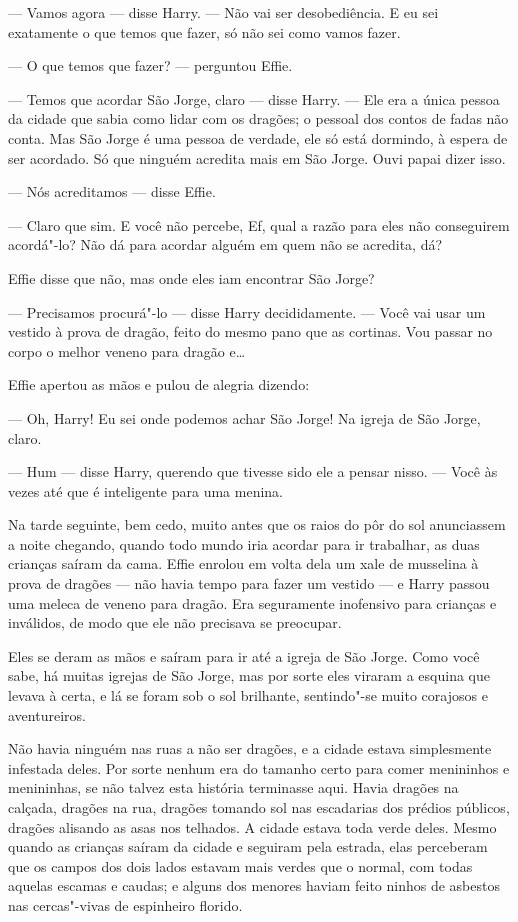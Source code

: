 --- Vamos agora --- disse Harry. --- Não vai ser desobediência. E eu sei
exatamente o que temos que fazer, só não sei como vamos fazer.

--- O que temos que fazer? --- perguntou Effie.

--- Temos que acordar São Jorge, claro --- disse Harry. --- Ele era a única
pessoa da cidade que sabia como lidar com os dragões; o pessoal dos
contos de fadas não conta. Mas São Jorge é uma pessoa de verdade, ele
só está dormindo, à espera de ser acordado. Só que ninguém acredita
mais em São Jorge. Ouvi papai dizer isso.

--- Nós acreditamos --- disse Effie.

--- Claro que sim. E você não percebe, Ef, qual a razão para eles não
conseguirem acordá"-lo? Não dá para acordar alguém em quem não se
acredita, dá?

Effie disse que não, mas onde eles iam encontrar São Jorge?

--- Precisamos procurá"-lo --- disse Harry decididamente. --- Você vai usar
um vestido à prova de dragão, feito do mesmo pano que as cortinas. 
Vou passar no corpo o melhor veneno para dragão e\ldots{}

Effie apertou as mãos e pulou de alegria dizendo:

--- Oh, Harry! Eu sei onde podemos achar São Jorge! Na igreja de São
Jorge, claro.

--- Hum --- disse Harry, querendo que tivesse sido ele a pensar nisso. ---
Você às vezes até que é inteligente para uma menina.

Na tarde seguinte, bem cedo, muito antes que os raios do
pôr do sol anunciassem a noite chegando, quando todo mundo iria
acordar para ir trabalhar, as duas crianças saíram da cama. Effie
enrolou em volta dela um xale de musselina à prova de dragões --- não
havia tempo para fazer um vestido --- e Harry passou uma meleca de
veneno para dragão. Era seguramente inofensivo para crianças e
inválidos, de modo que ele não precisava se preocupar.

Eles se deram as mãos e saíram para ir até a igreja de São Jorge. Como
você sabe, há muitas igrejas de São Jorge, mas por sorte eles viraram
a esquina que levava à certa, e lá se foram sob o sol brilhante,
sentindo"-se muito corajosos e aventureiros.

Não havia ninguém nas ruas a não ser dragões, e a cidade estava
simplesmente infestada deles. Por sorte nenhum era do tamanho certo
para comer menininhos e menininhas, se não talvez esta história
terminasse aqui. Havia dragões na calçada, dragões na rua,
dragões tomando sol nas escadarias dos prédios públicos, dragões
alisando as asas nos telhados. A cidade estava toda verde deles.
Mesmo quando as crianças saíram da cidade e seguiram pela estrada,
elas perceberam que os campos dos dois lados estavam mais verdes que
o normal, com todas aquelas escamas e caudas; e alguns dos menores
haviam feito ninhos de asbestos nas cercas"-vivas de espinheiro
florido.

